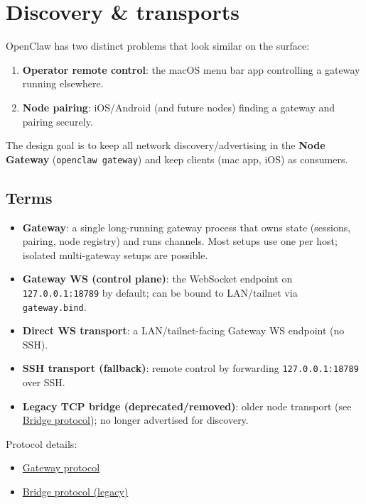 \clearpage

\section{Discovery \& transports}


OpenClaw has two distinct problems that look similar on the surface:

\begin{enumerate}
  \item \textbf{Operator remote control}: the macOS menu bar app controlling a gateway running elsewhere.
  \item \textbf{Node pairing}: iOS/Android (and future nodes) finding a gateway and pairing securely.
\end{enumerate}


The design goal is to keep all network discovery/advertising in the \textbf{Node Gateway} (\texttt{openclaw gateway}) and keep clients (mac app, iOS) as consumers.

\subsection{Terms}


\begin{itemize}
  \item \textbf{Gateway}: a single long-running gateway process that owns state (sessions, pairing, node registry) and runs channels. Most setups use one per host; isolated multi-gateway setups are possible.
  \item \textbf{Gateway WS (control plane)}: the WebSocket endpoint on \texttt{127.0.0.1:18789} by default; can be bound to LAN/tailnet via \texttt{gateway.bind}.
  \item \textbf{Direct WS transport}: a LAN/tailnet-facing Gateway WS endpoint (no SSH).
  \item \textbf{SSH transport (fallback)}: remote control by forwarding \texttt{127.0.0.1:18789} over SSH.
  \item \textbf{Legacy TCP bridge (deprecated/removed)}: older node transport (see \href{/gateway/bridge-protocol}{Bridge protocol}); no longer advertised for discovery.
\end{itemize}


Protocol details:

\begin{itemize}
  \item \href{/gateway/protocol}{Gateway protocol}
  \item \href{/gateway/bridge-protocol}{Bridge protocol (legacy)}
\end{itemize}


